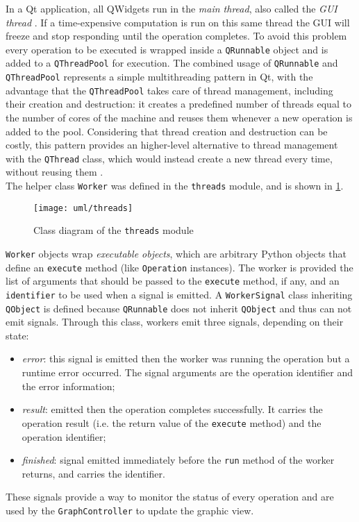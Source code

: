In a Qt application, all QWidgets run in the \textit{main thread}, also called the \textit{GUI thread} \cite{site:qt-threading-gui}. If a time-expensive computation is run on this same thread the GUI will freeze and stop responding until the operation completes. To avoid this problem every operation to be executed is wrapped inside a \texttt{QRunnable} object and is added to a \texttt{QThreadPool} for execution. The combined usage of \texttt{QRunnable} and \texttt{QThreadPool} represents a simple multithreading pattern in Qt, with the advantage that the \texttt{QThreadPool} takes care of thread management, including their creation and destruction: it creates a predefined number of threads equal to the number of cores of the machine and reuses them whenever a new operation is added to the pool. Considering that thread creation and destruction can be costly, this pattern provides an higher-level alternative to thread management with the \texttt{QThread} class, which would instead create a new thread every time, without reusing them \cite{site:qt-threading-reuse}.\\
The helper class \texttt{Worker} was defined in the \texttt{threads} module, and is shown in \cref{fig:threads_module}.
\begin{figure}
	\centering
	\texttt{[image: uml/threads]}
	\caption{Class diagram of the \texttt{threads} module}
	\label{fig:threads_module}
\end{figure}
\texttt{Worker} objects wrap \textit{executable objects}, which are arbitrary Python objects that define an \texttt{execute} method (like \texttt{Operation} instances). The worker is provided the list of arguments that should be passed to the \texttt{execute} method, if any, and an \texttt{identifier} to be used when a signal is emitted.
A \texttt{WorkerSignal} class inheriting \texttt{QObject} is defined because \texttt{QRunnable} does not inherit \texttt{QObject} and thus can not emit signals. 
Through this class, workers emit three signals, depending on their state:
\begin{itemize}
	\item \textit{error}: this signal is emitted then the worker was running the operation but a runtime error occurred. The signal arguments are the operation identifier and the error information;
	\item \textit{result}: emitted then the operation completes successfully. It carries the operation result (i.e. the return value of the \texttt{execute} method) and the operation identifier;
	\item \textit{finished}: signal emitted immediately before the \texttt{run} method of the worker returns, and carries the identifier.
\end{itemize}
These signals provide a way to monitor the status of every operation and are used by the \texttt{GraphController} to update the graphic view.

